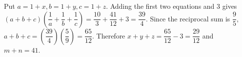 Put $a=1+x,b=1+y,c=1+z$. Adding the first two equations and $3$ gives $(a+b+c)(\dfrac{1}{a}+\dfrac{1}{b}+\dfrac{1}{c})=\dfrac{10}{3}+\dfrac{41}{12}+3=\dfrac{39}{4}$. Since the reciprocal sum is $\dfrac{9}{5}$, $a+b+c=(\dfrac{39}{4})(\dfrac{5}{9})=\dfrac{65}{12}$. Therefore $x+y+z=\dfrac{65}{12}-3=\dfrac{29}{12}$ and $\boxed{m+n=41}$.
